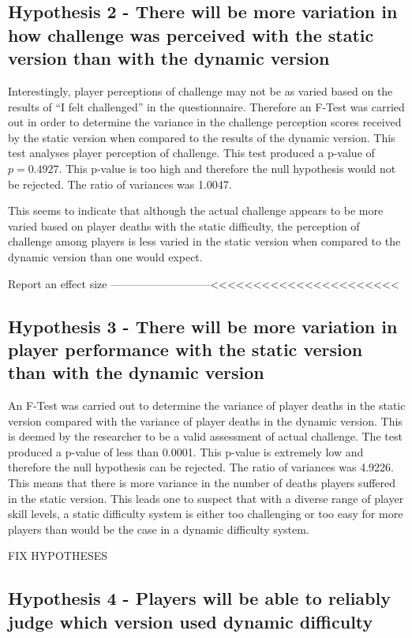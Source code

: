 \documentclass[journal]{IEEEtran}
\begin{document}
\subsection{Hypothesis 2 - There will be more variation in how challenge was perceived with the static version than with the dynamic version}

Interestingly, player perceptions of challenge may not be as varied based on the results of ``I felt challenged'' in the questionnaire. Therefore an F-Test was carried out in order to determine the variance in the challenge perception scores received by the static version when compared to the results of the dynamic version. This test analyses player perception of challenge. This test produced a p-value of $p = 0.4927$. This p-value is too high and therefore the null hypothesis would not be rejected. The ratio of variances was 1.0047.

This seems to indicate that although the actual challenge appears to be more varied based on player deaths with the static difficulty, the perception of challenge among players is less varied in the static version when compared to the dynamic  version than one would expect.

Report an effect size ---------------------------<<<<<<<<<<<<<<<<<<<<<<

\subsection{Hypothesis 3 - There will be more variation in player performance with the static version than with the dynamic version}

An F-Test was carried out to determine the variance of player deaths in the static version compared with the variance of player deaths in the dynamic version. This is deemed by the researcher to be a valid assessment of actual challenge. The test produced a p-value of less than 0.0001. This p-value is extremely low and therefore the null hypothesis can be rejected. The ratio of variances was 4.9226. This means that there is more variance in the number of deaths players suffered in the static version. This leads one to suspect that with a diverse range of player skill levels, a static difficulty system is either too challenging or too easy for more players than would be the case in a dynamic difficulty system.

FIX HYPOTHESES

\subsection{Hypothesis 4 - Players will be able to reliably judge which version used dynamic difficulty}
\end{document}
